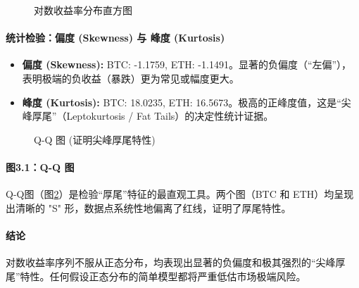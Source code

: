 \documentclass[a4paper]{ctexart}
\begin{document}
	\begin{figure}[htbp]
		\centering
		\caption{对数收益率分布直方图}
		\label{fig:return_hist}
	\end{figure}
	
	\paragraph{统计检验：偏度 (Skewness) 与 峰度 (Kurtosis)}
	\begin{itemize}
		\item \textbf{偏度 (Skewness):} BTC: -1.1759, ETH: -1.1491。显著的负偏度（“左偏”），表明极端的负收益（暴跌）更为常见或幅度更大。
		\item \textbf{峰度 (Kurtosis):} BTC: 18.0235, ETH: 16.5673。极高的正峰度值，这是“尖峰厚尾”（Leptokurtosis / Fat Tails）的决定性统计证据。
	\end{itemize}
	
	\begin{figure}[htbp]
		\centering
		\caption{Q-Q 图 (证明尖峰厚尾特性)}
		\label{fig:qq_plot}
	\end{figure}
	
	\paragraph{图3.1：Q-Q 图}
	Q-Q图（图\ref{fig:qq_plot}）是检验“厚尾”特征的最直观工具。两个图（BTC 和 ETH）均呈现出清晰的 "S" 形，数据点系统性地偏离了红线，证明了厚尾特性。
	
	\paragraph{结论}
	对数收益率序列不服从正态分布，均表现出显著的负偏度和极其强烈的“尖峰厚尾”特性。任何假设正态分布的简单模型都将严重低估市场极端风险。
	
\end{document}
